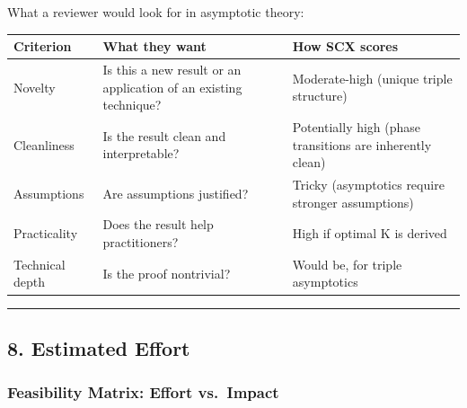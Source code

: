\documentclass[
  12pt,
]{article}
\begin{document}
What a reviewer would look for in asymptotic theory:

\begin{longtable}[]{@{}
  >{\raggedright\arraybackslash}p{}
  >{\raggedright\arraybackslash}p{}
  >{\raggedright\arraybackslash}p{}@{}}
\toprule\noalign{}
\begin{minipage}[b]{\linewidth}\raggedright
Criterion
\end{minipage} & \begin{minipage}[b]{\linewidth}\raggedright
What they want
\end{minipage} & \begin{minipage}[b]{\linewidth}\raggedright
How SCX scores
\end{minipage} \\
\midrule\noalign{}
\endhead
\bottomrule\noalign{}
\endlastfoot
Novelty & Is this a new result or an application of an existing
technique? & Moderate-high (unique triple structure) \\
Cleanliness & Is the result clean and interpretable? & Potentially high
(phase transitions are inherently clean) \\
Assumptions & Are assumptions justified? & Tricky (asymptotics require
stronger assumptions) \\
Practicality & Does the result help practitioners? & High if optimal K
is derived \\
Technical depth & Is the proof nontrivial? & Would be, for triple
asymptotics \\
\end{longtable}

\begin{center}\rule{0.5\linewidth}{0.5pt}\end{center}

\subsection{8. Estimated Effort}\label{estimated-effort}

\subsubsection{Feasibility Matrix: Effort
vs.~Impact}\label{feasibility-matrix-effort-vs.-impact}
\end{document}
